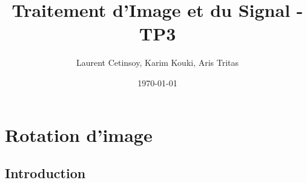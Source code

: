 
\usepackage[utf8]{inputenc} %
\usepackage[french]{babel} %
\usepackage{hyperref} %
\usepackage{amsmath} %
\usepackage{amssymb} %
\usepackage{amsthm} %
\usepackage{aeguill} %
\usepackage{listings} %
\usepackage{helvet} %
\usepackage{graphicx}
\usepackage{centernot}
\usepackage{dsfont}
\topmargin 0.0cm
\oddsidemargin 0.2cm
\textwidth 16cm 
\textheight 21cm
\footskip 0.0cm

\title{Traitement d'Image et du Signal - TP3}
\author{Laurent Cetinsoy, Karim Kouki, Aris Tritas }
\date{\today}


\maketitle

\section{Rotation d'image}

\subsection{Introduction} 

